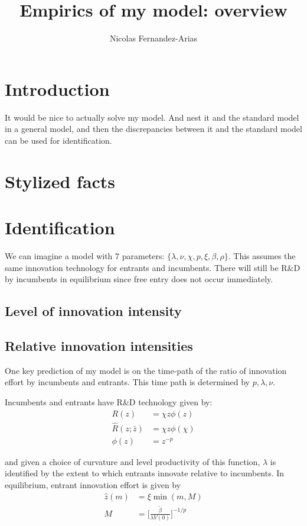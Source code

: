 \documentclass[12pt,english]{article}
\theoremstyle{remark}
\begin{document}
\title{Empirics of my model: overview}
\author{Nicolas Fernandez-Arias}
\maketitle

\section{Introduction}
It would be nice to actually solve my model. And nest it and the standard model in a general model, and then the discrepancies between it and the standard model can be used for identification.


\section{Stylized facts}


\section{Identification}
We can imagine a model with 7 parameters: $\{\lambda,\nu,\chi,p,\xi,\beta,\rho \}$. This assumes the same innovation technology for entrants and incumbents. There will still be R\&D by incumbents in equilibrium since free entry does not occur immediately. 

\subsection{Level of innovation intensity}

\subsection{Relative innovation intensities}
One key prediction of my model is on the time-path of the ratio of innovation effort by incumbents and entrants. This time path is determined by $p,\lambda,\nu$. 

Incumbents and entrants have R\&D technology given by:
\begin{align*}
R(z) &= \chi z \phi(z) \\
\hat{R}(z;\bar{z}) &= \chi z \phi(\chi) \\
\phi(z) &= z^{-p}
\end{align*}

and given a choice of curvature and level productivity of this function, $\lambda$ is identified by the extent to which entrants innovate relative to incumbents. In equilibrium, entrant innovation effort is given by
\begin{align*}
\hat{z}(m) &= \xi \min(m,M) \\ 
M &= \Big[ \frac{\tilde{\beta}}{\lambda V(0)} \Big]^{-1/p}
\end{align*}
\end{document}
